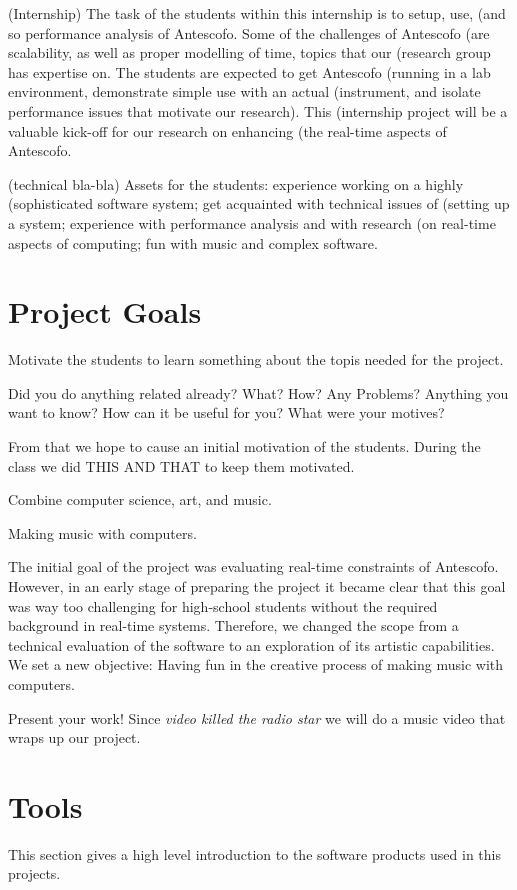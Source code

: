 \documentclass[onecolumn,nocopyrightspace,preprint]{sigplanconf}
\begin{document}
(Internship) The task of the students within this internship is to setup, use,
(and so performance analysis of Antescofo. Some of the challenges of Antescofo
(are scalability, as well as proper modelling of time, topics that our
(research group has expertise on. The students are expected to get Antescofo
(running in a lab environment, demonstrate simple use with an actual
(instrument, and isolate performance issues that motivate our research). This
(internship project will be a valuable kick-off for our research on enhancing
(the real-time aspects of Antescofo.

(technical bla-bla) Assets for the students: experience working on a highly
(sophisticated software system; get acquainted with technical issues of
(setting up a system; experience with performance analysis and with research
(on real-time aspects of computing; fun with music and complex software.



\section{Project Goals}


Motivate the students to learn something about the topis needed for the project.

Did you do anything related already? What? How? Any Problems? Anything you want to know?
How can it be useful for you?
What were your motives?

From that we hope to cause an initial motivation of the students. During the class we did THIS AND THAT
to keep them motivated.


Combine computer science, art, and music.


Making music with computers.

The initial goal of the project was evaluating real-time constraints of
Antescofo. However, in an early stage of preparing the project it became clear
that this goal was way too challenging for high-school students without the
required background in real-time systems. Therefore, we changed the scope from
a technical evaluation of the software to an exploration of its artistic
capabilities. We set a new objective: Having fun in the creative process of
making music with computers.


Present your work! Since \textit{video killed the radio star} we will do a music video
that wraps up our project.



\section{Tools}
This section gives a high level introduction to the software products
used in this projects.
\end{document}
